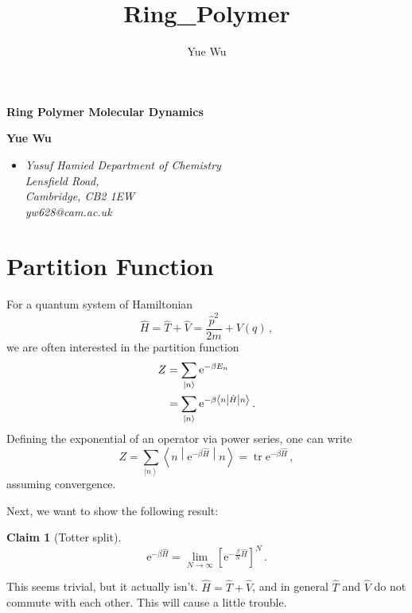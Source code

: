 \documentclass{article}
\title{Ring_Polymer}
\author{Yue Wu}
\theoremstyle{plain}\theoremheaderfont{\normalfont\itshape}\theorembodyfont{\rmfamily}\theoremseparator{.}\newtheorem*{rem}{Remark}\newtheorem*{ex}{Example}\newtheorem*{proof}{Proof}\newtheorem*{altp}{Alternative proof}
\theoremstyle{plain}\theoremheaderfont{\normalfont\bfseries}\theorembodyfont{\rmfamily}\theoremseparator{.}\newtheorem{thm}{Theorem}[section]\newtheorem{lem}[thm]{Lemma}\newtheorem{prop}[thm]{Proposition}\newtheorem*{cor}{Corollary}\newtheorem{defn}[thm]{Definition}\newtheorem{clm}[thm]{Claim}\newtheorem{clminproof}{Claim}
\theoremstyle{break}\theoremheaderfont{\normalfont\itshape}\theorembodyfont{\rmfamily}\theoremseparator{.\medskip}\newtheorem*{proofskip}{Proof}\newtheorem*{exs}{Examples}\newtheorem*{rems}{Remarks}
\theoremstyle{break}\theoremheaderfont{\normalfont\bfseries}\theorembodyfont{\rmfamily}\theoremseparator{.\medskip}\newtheorem{lemskip}[thm]{Lemma}\newtheorem{defnskip}[thm]{Definition}\newtheorem{propskip}[thm]{Proposition}\newtheorem{thmskip}[thm]{Theorem}
\numberwithin{equation}{section}
\newcommand{\ee}{\mathrm{e}}
\newcommand{\ket}[1]{\left| #1 \right\rangle}
\newcommand{\mel}[3]{\left\langle #1 \middle| #2 \middle| #3 \right\rangle}
\newcommand{\expval}[2]{\left\langle #2 \middle| #1 \middle| #2 \right\rangle}
\DeclareMathOperator{\tr}{tr}
\begin{document}
    \setlength{\parindent}{0pt}
	\Huge\textsf{\textbf{Ring Polymer Molecular Dynamics}}

	\noindent\makebox[\linewidth]{\rule{\textwidth}{2pt}}

	\large\textsf{\textbf{Yue Wu}}
	\begin{itemize}[topsep=0pt,leftmargin=15pt]
		\item[] \textit{Yusuf Hamied Department of Chemistry\\
		Lensfield Road,\\
		Cambridge, CB2 1EW}\\

		\textit{yw628@cam.ac.uk}
	\end{itemize}
    \thispagestyle{empty}
    \setlength{\parindent}{15pt}

    \normalsize
	\newpage
	\tableofcontents
	\newpage

    \section{Partition Function}
    For a quantum system of Hamiltonian
    \begin{equation}
        \hat{H}=\hat{T}+\hat{V}=\frac{\hat{p}^2}{2m}+V(q)\,,
    \end{equation}    
    we are often interested in the partition function
    \begin{align}
        Z&=\sum_{\ket{n}}\ee^{-\beta E_n}\notag \\
        &=\sum_{\ket{n}} \ee^{-\beta\mel{n}{\hat{H}}{n}}\,.
    \end{align}
    Defining the exponential of an operator via power series, one can write
    \begin{equation}
        Z=\sum_{\ket{n}}\expval{\ee^{-\beta\hat{H}}}{n}=\tr\ee^{-\beta\hat{H}}\,,
    \end{equation}
    assuming convergence.

    Next, we want to show the following result:
    \begin{clm}[Totter split]
        \begin{equation}
            \ee^{-\beta\hat{H}}=\lim_{N\to\infty}\left[\ee^{-\frac{\beta}{N}\hat{H}}\right]^N\,.
        \end{equation}
    \end{clm}
    This seems trivial, but it actually isn't. \(\hat{H}=\hat{T}+\hat{V}\), and in general \(\hat{T}\) and \(\hat{V}\) do not commute with each other. This will cause a little trouble.
    
\end{document}
